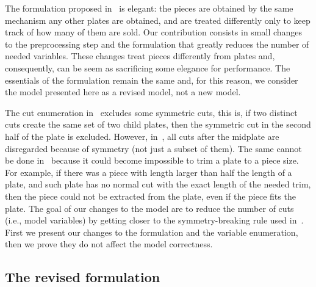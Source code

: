 \documentclass[runningheads]{llncs}
\begin{document}
The formulation proposed in~\cite{furini:2016} is elegant: the pieces are obtained by the same mechanism any other plates are obtained, and are treated differently only to keep track of how many of them are sold.
Our contribution consists in small changes to the preprocessing step and the formulation that greatly reduces the number of needed variables.
These changes treat pieces differently from plates and, consequently, can be seem as sacrificing some elegance for performance.
The essentials of the formulation remain the same and, for this reason, we consider the model presented here as a revised model, not a new model.


The cut enumeration in~\cite{furini:2016} excludes some symmetric cuts, this is, if two distinct cuts create the same set of two child plates, then the symmetric cut in the second half of the plate is excluded.
However, in~\cite{nicos:1977}, all cuts after the midplate are disregarded because of symmetry (not just a subset of them).
The same cannot be done in~\cite{furini:2016} because it could become impossible to trim a plate to a piece size.
For example, if there was a piece with length larger than half the length of a plate, and such plate has no normal cut with the exact length of the needed trim, then the piece could not be extracted from the plate, even if the piece fits the plate.
The goal of our changes to the model are to reduce the number of cuts (i.e., model variables) by getting closer to the symmetry-breaking rule used in~\cite{nicos:1977}.
First we present our changes to the formulation and the variable enumeration, then we prove they do not affect the model correctness.


\subsection{The revised formulation}
\end{document}
